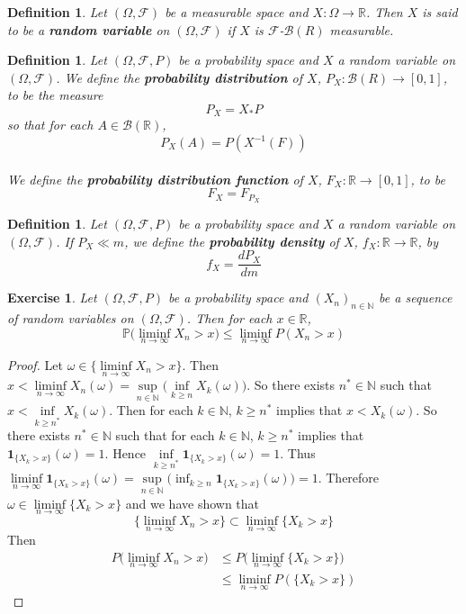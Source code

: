 \documentclass[12pt]{amsart}
\newtheorem{defn}[thm]{Definition}
\newtheorem{ex}[thm]{Exercise}
\newcommand{\om}{\omega}
\newcommand{\Om}{\Omega}
\newcommand{\N}{\mathbb{N}}
\newcommand{\R}{\mathbb{R}}
\renewcommand{\P}{\mathbb{P}}
\newcommand{\MB}{\mathcal{B}}
\newcommand{\MF}{\mathcal{F}}
\begin{document}
	\begin{defn}
		Let $(\Om, \MF)$ be a measurable space and $X:\Om \rightarrow \R$. Then $X$ is said to be a \textbf{random variable} on $(\Om, \MF)$ if $X$ is $\MF$-$\MB(R)$ measurable. 
	\end{defn}
	
	\begin{defn}
		Let $(\Om, \MF, P)$ be a probability space and $X$ a random variable on $(\Om,\MF)$. We define the \textbf{probability distribution} of $X$, $P_X:\MB(R) \rightarrow [0,1]$, to be the measure $$P_X = X_*P$$ so that for each $A \in \MB(\R)$, $$P_X(A) = P(X^{-1}(F))$$ \\ We define the \textbf{probability distribution function} of $X$, $F_X:\R \rightarrow [0,1]$, to be $$F_X = F_{P_X}$$
	\end{defn}
	
	\begin{defn}
		Let $(\Om, \MF, P)$ be a probability space and $X$ a random variable on $(\Om,\MF)$. If $P_X \ll m$, we define the \textbf{probability density} of $X$, $f_X: \R \rightarrow \R$, by $$f_X = \frac{dP_X}{dm}$$ 
	\end{defn}
	
	\begin{ex}
		Let $(\Om, \MF, P)$ be a probability space and $(X_n)_{n \in \N}$ be a sequence of random variables on $(\Om, \MF)$. Then for each $x \in \R$, $$\P\bigg(\liminf_{n \rightarrow \infty}X_n > x\bigg) \leq \liminf_{n \rightarrow \infty} P(X_n > x)$$  
	\end{ex}
	
	\begin{proof}
		Let $\om \in \bigg \{ \liminf\limits_{n \rightarrow \infty} X_n > x \bigg \}$. Then $x< \liminf\limits_{n \rightarrow \infty} X_n (\om) = \sup\limits_{n \in \N} \bigg( \inf\limits_{k \geq n} X_k(\om)\bigg)$. So there exists $n^* \in \N$ such that $x< \inf\limits_{k \geq n^*} X_k(\om)$. Then for each $k \in \N$, $k \geq n^*$ implies that $x < X_k(\om)$. So there exists $n^* \in \N$ such that for each $k \in \N$, $k \geq n^*$ implies that $\mathbf{1}_{\{X_k > x\}}(\om) =1$. Hence $\inf\limits_{k \geq n^*} \mathbf{1}_{\{X_k > x\}}(\om)  = 1$. Thus  $\liminf\limits_{n \rightarrow \infty} \mathbf{1}_{\{X_k > x\}}(\om) = \sup\limits_{n \in \N} \bigg( \inf_{k \geq n} \mathbf{1}_{\{X_k > x\}}(\om) \bigg) = 1$. Therefore $\om \in \liminf\limits_{n \rightarrow \infty} \{X_k > x\}$ and we have shown that $$\bigg \{ \liminf\limits_{n \rightarrow \infty} X_n > x \bigg \} \subset \liminf\limits_{n \rightarrow \infty} \{X_k > x\}$$ Then 
		\begin{align*}
			P \bigg( \liminf\limits_{n \rightarrow \infty} X_n > x \bigg)
			& \leq P \bigg( \liminf\limits_{n \rightarrow \infty} \{X_k > x\} \bigg) \\
			& \leq \liminf_{n \rightarrow \infty} P(\{X_k > x\})
		\end{align*}
	\end{proof}
	
\end{document}
